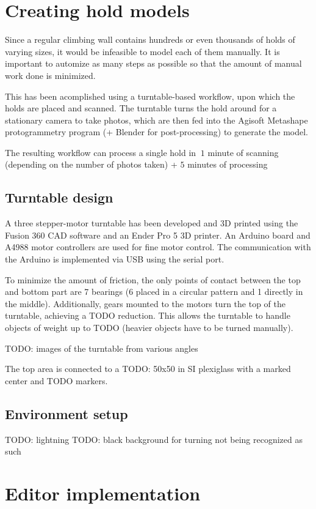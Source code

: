 \section{Creating hold models}
Since a regular climbing wall contains hundreds or even thousands of holds of varying sizes, it would be infeasible to model each of them manually.
It is important to automize as many steps as possible so that the amount of manual work done is minimized.

This has been acomplished using a turntable-based workflow, upon which the holds are placed and scanned.
The turntable turns the hold around for a stationary camera to take photos, which are then fed into the Agisoft Metashape protogrammetry program (+ Blender for post-processing) to generate the model.

The resulting workflow can process a single hold in $~1$ minute of scanning (depending on the number of photos taken) + $5$ minutes of processing

\subsection{Turntable design}
A three stepper-motor turntable has been developed and 3D printed using the Fusion 360 CAD software and an Ender Pro 5 3D printer.
An Arduino board and A4988 motor controllers are used for fine motor control.
The communication with the Arduino is implemented via USB using the serial port.


To minimize the amount of friction, the only points of contact between the top and bottom part are 7 bearings (6 placed in a circular pattern and 1 directly in the middle).
Additionally, gears mounted to the motors turn the top of the turntable, achieving a TODO reduction.
This allows the turntable to handle objects of weight up to TODO (heavier objects have to be turned manually).

TODO: images of the turntable from various angles

The top area is connected to a TODO: 50x50 in SI plexiglass with a marked center and TODO markers.

\subsection{Environment setup}
TODO: lightning
TODO: black background for turning not being recognized as such




\section{Editor implementation}

